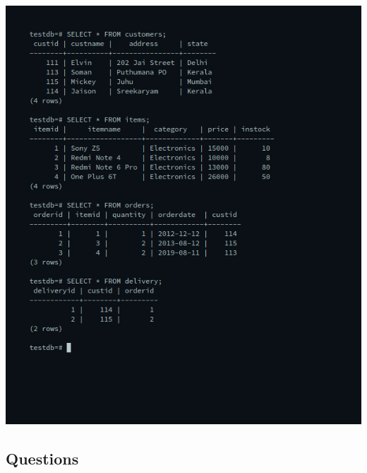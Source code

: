 \documentclass[10pt,a4paper,titlepage]{report}
\begin{document}
{\includegraphics[width=\linewidth]{../Images/Joins/tables.png}

\subsection{Questions}

}
\end{document}
